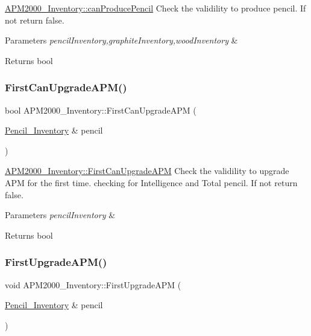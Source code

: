 \mbox{\hyperlink{classAPM2000__Inventory_a57eae269c4c67d3133175d6006373d2b}{A\+P\+M2000\+\_\+\+Inventory\+::can\+Produce\+Pencil}} Check the validility to produce pencil. If not return false. 


\begin{DoxyParams}{Parameters}
{\em pencil\+Inventory,graphite\+Inventory,wood\+Inventory} & \\
\hline
\end{DoxyParams}
\begin{DoxyReturn}{Returns}
bool 
\end{DoxyReturn}
\mbox{\label{classAPM2000__Inventory_a33bd841a262cb1b7901c7dfaf851da7c}} 
\subsubsection{\texorpdfstring{FirstCanUpgradeAPM()}{FirstCanUpgradeAPM()}}
{\footnotesize\ttfamily bool A\+P\+M2000\+\_\+\+Inventory\+::\+First\+Can\+Upgrade\+A\+PM (\begin{DoxyParamCaption}\item[{\mbox{\hyperlink{classPencil__Inventory}{Pencil\+\_\+\+Inventory}} \&}]{pencil }\end{DoxyParamCaption})}



\mbox{\hyperlink{classAPM2000__Inventory_a33bd841a262cb1b7901c7dfaf851da7c}{A\+P\+M2000\+\_\+\+Inventory\+::\+First\+Can\+Upgrade\+A\+PM}} Check the validility to upgrade A\+PM for the first time. checking for Intelligence and Total pencil. If not return false. 


\begin{DoxyParams}{Parameters}
{\em pencil\+Inventory} & \\
\hline
\end{DoxyParams}
\begin{DoxyReturn}{Returns}
bool 
\end{DoxyReturn}
\mbox{\label{classAPM2000__Inventory_a5e40a4bddfb46321d256787f678808f7}} 
\subsubsection{\texorpdfstring{FirstUpgradeAPM()}{FirstUpgradeAPM()}}
{\footnotesize\ttfamily void A\+P\+M2000\+\_\+\+Inventory\+::\+First\+Upgrade\+A\+PM (\begin{DoxyParamCaption}\item[{\mbox{\hyperlink{classPencil__Inventory}{Pencil\+\_\+\+Inventory}} \&}]{pencil }\end{DoxyParamCaption})}



